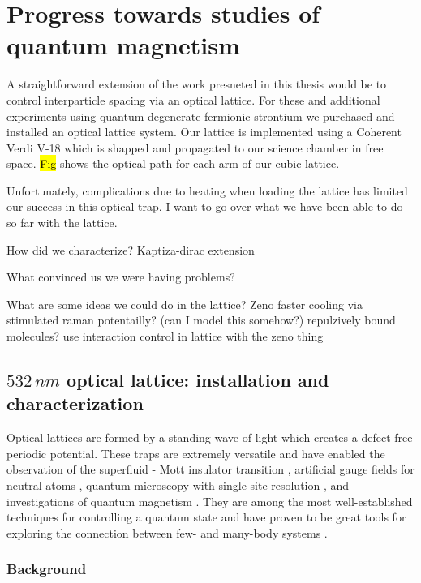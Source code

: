 \chapter{Progress towards studies of quantum magnetism}
\label{ch:chap6}

A straightforward extension of the work presneted in this thesis would be to control interparticle spacing via an optical lattice. For these and additional experiments using quantum degenerate fermionic strontium we purchased and installed an optical lattice system. Our lattice is implemented using a Coherent Verdi V-18 which is shapped and propagated to our science chamber in free space. \hl{Fig} shows the optical path for each arm of our cubic lattice. 

Unfortunately, complications due to heating when loading the lattice has limited our success in this optical trap. I want to go over what we have been able to do so far with the lattice.

How did we characterize?
	Kaptiza-dirac extension
	
What convinced us we were having problems?

What are some ideas we could do in the lattice?
	Zeno
	faster cooling via stimulated raman potentailly? (can I model this somehow?)
	repulzively bound molecules?
	use interaction control in lattice with the zeno thing
	
	

\section{$532\,nm$ optical lattice: installation and characterization}
\label{sec:lattice}

Optical lattices are formed by a standing wave of light which creates a defect free periodic potential. These traps are extremely versatile and have enabled the observation of the superfluid - Mott insulator transition \cite{Greiner2002}, artificial gauge fields for neutral atoms \cite{Lin2011}, quantum microscopy with single-site resolution \cite{Bakr2009}, and investigations of quantum magnetism \cite{Hart2015,Greif2015}. They are among the most well-established techniques for controlling a quantum state and have proven to be great tools for exploring the connection between few- and many-body systems \cite{Bloch2008}.

\subsection{Background}
\label{ssec:lattice_background}

